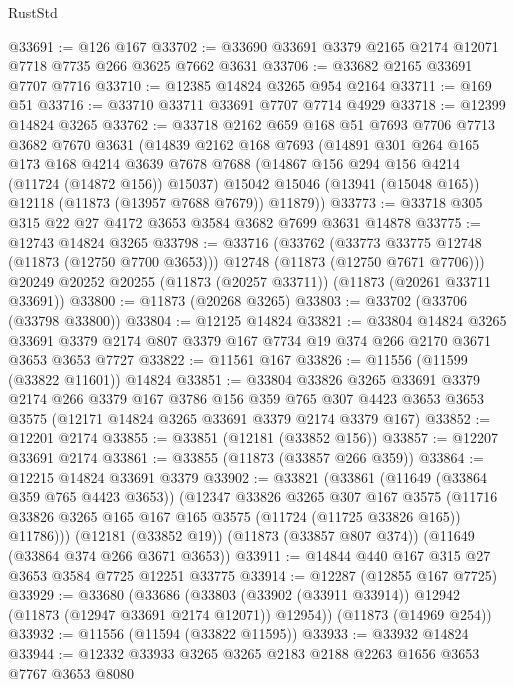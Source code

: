 \begin{lexlean}{RustStd}
\begin{coremodule}
@33691 := @126 @167
@33702 := @33690 @33691 @3379 @2165 @2174 @12071 @7718 @7735 @266 @3625 @7662 @3631
@33706 := @33682 @2165 @33691 @7707 @7716
@33710 := @12385 @14824 @3265 @954 @2164
@33711 := @169 @51
@33716 := @33710 @33711 @33691 @7707 @7714 @4929
@33718 := @12399 @14824 @3265
@33762 := @33718
    @2162
    @659
    @168
    @51
    @7693
    @7706
    @7713
    @3682
    @7670
    @3631
    (@14839
      @2162
      @168
      @7693
      (@14891
        @301
        @264
        @165
        @173
        @168
        @4214
        @3639
        @7678
        @7688
        (@14867 @156 @294 @156 @4214 (@11724 (@14872 @156)) @15037)
        @15042
        @15046
        (@13941 (@15048 @165))
        @12118
        (@11873 (@13957 @7688 @7679))
        @11879))
@33773 := @33718 @305 @315 @22 @27 @4172 @3653 @3584 @3682 @7699 @3631 @14878
@33775 := @12743 @14824 @3265
@33798 := @33716
    (@33762
      (@33773 @33775 @12748 (@11873 (@12750 @7700 @3653)))
      @12748
      (@11873 (@12750 @7671 @7706)))
    @20249
    @20252
    @20255
    (@11873 (@20257 @33711))
    (@11873 (@20261 @33711 @33691))
@33800 := @11873 (@20268 @3265)
@33803 := @33702 (@33706 (@33798 @33800))
@33804 := @12125 @14824
@33821 := @33804
    @14824
    @3265
    @33691
    @3379
    @2174
    @807
    @3379
    @167
    @7734
    @19
    @374
    @266
    @2170
    @3671
    @3653
    @3653
    @7727
@33822 := @11561 @167
@33826 := @11556 (@11599 (@33822 @11601)) @14824
@33851 := @33804
    @33826
    @3265
    @33691
    @3379
    @2174
    @266
    @3379
    @167
    @3786
    @156
    @359
    @765
    @307
    @4423
    @3653
    @3653
    @3575
    (@12171 @14824 @3265 @33691 @3379 @2174 @3379 @167)
@33852 := @12201 @2174
@33855 := @33851 (@12181 (@33852 @156))
@33857 := @12207 @33691 @2174
@33861 := @33855 (@11873 (@33857 @266 @359))
@33864 := @12215 @14824 @33691 @3379
@33902 := @33821
    (@33861
      (@11649 (@33864 @359 @765 @4423 @3653))
      (@12347
        @33826
        @3265
        @307
        @167
        @3575
        (@11716 @33826 @3265 @165 @167 @165 @3575 (@11724 (@11725 @33826 @165)) @11786)))
    (@12181 (@33852 @19))
    (@11873 (@33857 @807 @374))
    (@11649 (@33864 @374 @266 @3671 @3653))
@33911 := @14844 @440 @167 @315 @27 @3653 @3584 @7725 @12251 @33775
@33914 := @12287 (@12855 @167 @7725)
@33929 := @33680
    (@33686 (@33803 (@33902 (@33911 @33914)) @12942 (@11873 (@12947 @33691 @2174 @12071)) @12954))
    (@11873 (@14969 @254))
@33932 := @11556 (@11594 (@33822 @11595))
@33933 := @33932 @14824
@33944 := @12332 @33933 @3265 @3265 @2183 @2188 @2263 @1656 @3653 @7767 @3653 @8080

\end{coremodule}
\end{lexlean}
